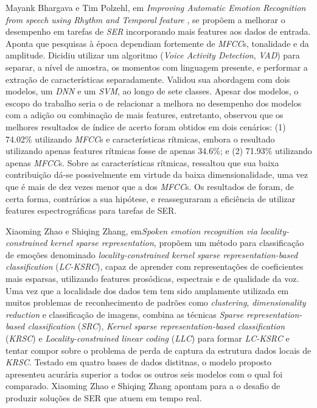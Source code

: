 Mayank Bhargava e Tim Polzehl, em \textit{Improving Automatic Emotion Recognition from speech using Rhythm and Temporal feature} \cite{11}, se propõem a melhorar o desempenho em tarefas de \textit{SER} incorporando mais features aos dados de entrada. Aponta que pesquisas à época dependiam fortemente de \textit{MFCC}s, tonalidade e da amplitude. Dicidiu utilizar um algoritmo (\textit{Voice Activity Detection}, \textit{VAD}) para separar, a nível de amostra, os momentos com linguagem presente, e performar a extração de características separadamente. Validou sua abordagem com dois modelos, um \textit{DNN} e um \textit{SVM}, ao longo de sete classes. Apesar dos modelos, o escopo do trabalho seria o de relacionar a melhora no desempenho dos modelos com a adição ou combinação de mais features, entretanto, observou que os melhores resultados de índice de acerto foram obtidos em dois cenários: (1) 74.02\% utilizando \textit{MFCC}s e características rítmicas, embora o resultado utilizando apenas features rítmicas fosse de apenas 34.6\%; e (2) 71.93\% utilizando apenas \textit{MFCC}s. Sobre as características rítmicas, ressaltou que sua baixa contribuição dá-se possivelmente em virtude da baixa dimensionalidade, uma vez que é mais de dez vezes menor que a dos \textit{MFCC}s. Os resultados de \cite{11} foram, de certa forma, contrários a sua hipótese, e reasseguraram a eficiência de utilizar features espectrográficas para tarefas de SER.

Xiaoming Zhao e Shiqing Zhang, em\textit{Spoken emotion recognition via locality-constrained kernel sparse representation}\cite{32.31}, propõem um método para classificação de emoções denominado \textit{locality-constrained kernel sparse representation-based classification} (\textit{LC-KSRC}), capaz de aprender com representações de coeficientes mais esparsas, utilizando features prosódicas, espectrais e de qualidade da voz. Uma vez que a localidade dos dados tem tem sido amplamente utilizada em muitos problemas de reconhecimento de padrões como \textit{clustering}, \textit{dimensionality reduction} e classificação de imagens, \cite{32.31} combina as técnicas \textit{Sparse representation-based classification} (\textit{SRC}), \textit{Kernel sparse representation-based classification} (\textit{KRSC}) e \textit{Locality-constrained linear coding} (\textit{LLC}) para formar \textit{LC-KSRC} e tentar compor sobre o problema de perda de captura da estrutura dados locais de \textit{KRSC}. Testado em quatro bases de dados distitnas, o modelo proposto apresenteu acurária superior a todos os outros seis modelos com o qual foi comparado. Xiaoming Zhao e Shiqing Zhang apontam para a o desafio de produzir soluções de SER que atuem em tempo real.

